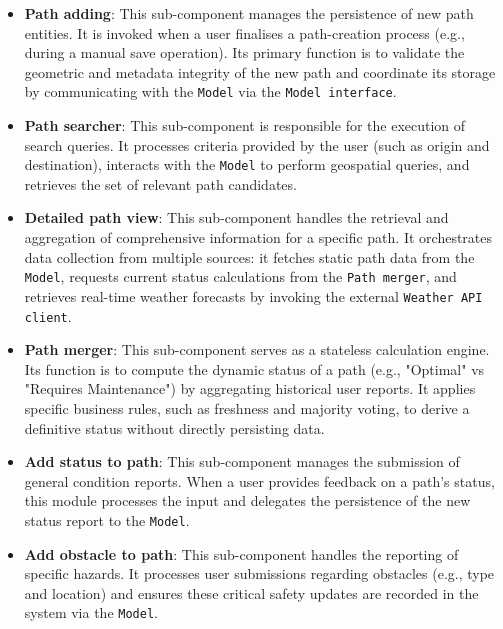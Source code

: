 \begin{itemize}
    \item \textbf{Path adding}: This sub-component manages the persistence of new path entities. It is invoked when a user finalises a path-creation process (e.g., during a manual save operation). Its primary function is to validate the geometric and metadata integrity of the new path and coordinate its storage by communicating with the \texttt{Model} via the \texttt{Model interface}.

    \item \textbf{Path searcher}: This sub-component is responsible for the execution of search queries. It processes criteria provided by the user (such as origin and destination), interacts with the \texttt{Model} to perform geospatial queries, and retrieves the set of relevant path candidates.

    \item \textbf{Detailed path view}: This sub-component handles the retrieval and aggregation of comprehensive information for a specific path. It orchestrates data collection from multiple sources: it fetches static path data from the \texttt{Model}, requests current status calculations from the \texttt{Path merger}, and retrieves real-time weather forecasts by invoking the external \texttt{Weather API client}.

    \item \textbf{Path merger}: This sub-component serves as a stateless calculation engine. Its function is to compute the dynamic status of a path (e.g., "Optimal" vs "Requires Maintenance") by aggregating historical user reports. It applies specific business rules, such as freshness and majority voting, to derive a definitive status without directly persisting data.

    \item \textbf{Add status to path}: This sub-component manages the submission of general condition reports. When a user provides feedback on a path's status, this module processes the input and delegates the persistence of the new status report to the \texttt{Model}.

    \item \textbf{Add obstacle to path}: This sub-component handles the reporting of specific hazards. It processes user submissions regarding obstacles (e.g., type and location) and ensures these critical safety updates are recorded in the system via the \texttt{Model}.
\end{itemize}

